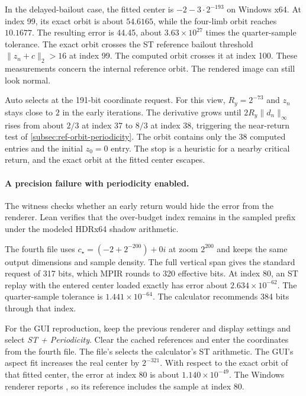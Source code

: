 In the delayed-bailout case, the fitted center
is \(-2-3\cdot 2^{-193}\) on Windows x64. At index 99, its exact orbit
is about \(54.6165\), while the four-limb orbit reaches \(10.1677\).
The resulting error is 44.45, about \(3.63\times10^{27}\) times the
quarter-sample tolerance. The exact orbit crosses the ST reference
bailout threshold \(\lVert z_n+c\rVert_2>16\) at index 99. The computed
orbit crosses it at index 100. These measurements concern the internal
reference orbit. The rendered image can still look normal.

Auto selects  at the 191-bit coordinate request.
For this view, \(R_y=2^{-73}\) and \(z_n\) stays close to \(2\) in the
early iterations. The derivative grows until \(2R_y\lVert d_n\rVert_\infty\)
rises from about \(2/3\) at index 37 to \(8/3\) at index 38, triggering
the near-return test of \cref{subsec:ref-orbit-periodicity}. The orbit
contains only the 38 computed entries and the initial \(z_0=0\) entry.
The stop is a heuristic for a nearby critical return, and the exact
orbit at the fitted center escapes.

\paragraph{A precision failure with periodicity enabled.}
The witness checks whether an early return would hide the error from the
renderer. Lean verifies that the over-budget index remains in the sampled
prefix under the modeled HDRx64 shadow arithmetic.

The fourth file uses \(c_\star=(-2+2^{-200})+0i\) at zoom \(2^{200}\)
and keeps the same output dimensions and sample density. The full
vertical span gives the standard request of 317 bits, which MPIR
rounds to 320 effective bits. At index 80, an ST replay with the
entered center loaded exactly has error about \(2.634\times10^{-62}\).
The quarter-sample tolerance is \(1.441\times10^{-64}\).
The calculator recommends 384 bits through that index.

For the GUI reproduction, keep the previous renderer and display
settings and select \emph{ST + Periodicity}. Clear the cached
references and enter the coordinates from the fourth file.
The file's  selects the calculator's ST arithmetic.
The GUI's aspect fit increases the real center by \(2^{-321}\).
With respect to the exact orbit of that fitted center, the error at
index 80 is about \(1.140\times10^{-49}\). The Windows renderer
reports , so its reference includes
the sample at index 80.

